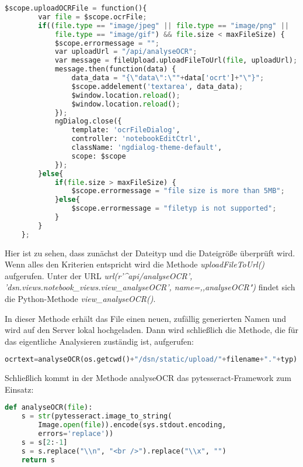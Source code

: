 \begin{lstlisting}[caption={Upload OCR-File}, language=Python]
$scope.uploadOCRFile = function(){
        var file = $scope.ocrFile;
        if((file.type == "image/jpeg" || file.type == "image/png" ||
        	file.type == "image/gif") && file.size < maxFileSize) {
            $scope.errormessage = "";
            var uploadUrl = "/api/analyseOCR";
            var message = fileUpload.uploadFileToUrl(file, uploadUrl);
            message.then(function(data) {
                data_data = "{\"data\":\""+data['ocrt']+"\"}";
                $scope.addelement('textarea', data_data);
                $window.location.reload();
                $window.location.reload();
            });
            ngDialog.close({
                template: 'ocrFileDialog',
                controller: 'notebookEditCtrl',
                className: 'ngdialog-theme-default',
                scope: $scope
            });
        }else{
            if(file.size > maxFileSize) {
                $scope.errormessage = "file size is more than 5MB";
            }else{
                $scope.errormessage = "filetyp is not supported";
            }
        }
    };
\end{lstlisting}

Hier ist zu sehen, dass zunächst der Dateityp und die Dateigröße überprüft wird. Wenn alles den Kriterien entspricht wird die Methode \textit{uploadFileToUrl()} aufgerufen. Unter der URL \textit{url(r'\^{}api/analyseOCR', 'dsn.views.notebook\_views.view\_analyseOCR', name=,,analyseOCR")} findet sich die Python-Methode \textit{view\_analyseOCR()}.

In dieser Methode erhält das File einen neuen, zufällig generierten Namen und wird auf den Server lokal hochgeladen. Dann wird schließlich die Methode, die für das eigentliche Analysieren zuständig ist, aufgerufen:

\begin{lstlisting}[caption={OCR-Analyse}, language=Python]
ocrtext=analyseOCR(os.getcwd()+"/dsn/static/upload/"+filename+"."+typ)
\end{lstlisting}

\newpage

Schließlich kommt in der Methode analyseOCR das pytesseract-Framework zum Einsatz:

\begin{lstlisting}[caption={analyseOCR mittels pytesseract}, language=Python]
def analyseOCR(file):
	s = str(pytesseract.image_to_string(
		Image.open(file)).encode(sys.stdout.encoding,
		errors='replace'))
    s = s[2:-1]
    s = s.replace("\\n", "<br />").replace("\\x", "")
    return s
\end{lstlisting}

